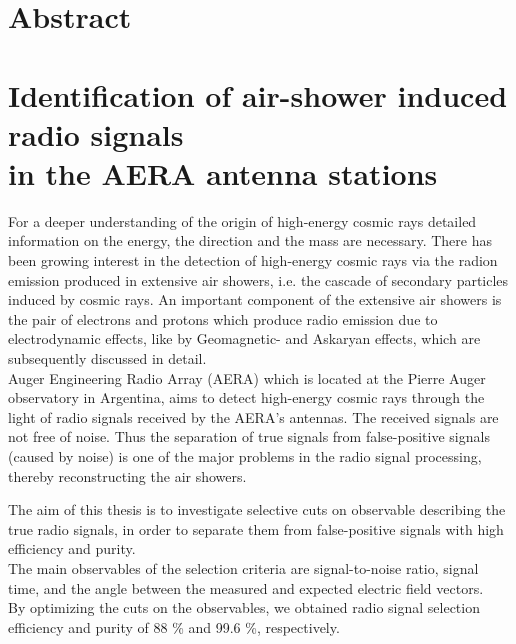 \section*{\Large \bfseries Abstract}
\vspace{3cm}
\section*{Identification of air-shower induced radio signals \\ in the AERA antenna stations}
For a deeper understanding of the origin of high-energy cosmic rays detailed information on the energy, the direction and the mass are necessary. There has been growing interest in the detection of high-energy cosmic rays via the radion emission produced in extensive air showers, i.e. the cascade of secondary particles induced by cosmic rays. An important component of the extensive air showers is the pair of electrons and protons which produce radio emission due to electrodynamic effects, like  by Geomagnetic- and Askaryan effects, which are subsequently discussed in detail.\\ 
Auger Engineering Radio Array (AERA) which is located at the Pierre Auger observatory in Argentina, aims to detect high-energy cosmic rays through the light of radio signals received by the AERA's antennas. The received signals are not free of noise.
Thus the separation of true signals from false-positive signals (caused by noise) is one of the major problems in the radio signal processing, thereby reconstructing the air showers.

The aim of this thesis is to investigate selective cuts on observable describing the true radio signals, in order to separate them from false-positive signals with high efficiency and purity.
\\
The main observables of the selection criteria are signal-to-noise ratio, signal time, and the angle between the measured and expected electric field vectors.
\\
By optimizing the cuts on the observables, we obtained radio signal selection  efficiency and purity of 88 \% and 99.6 \%, respectively.
